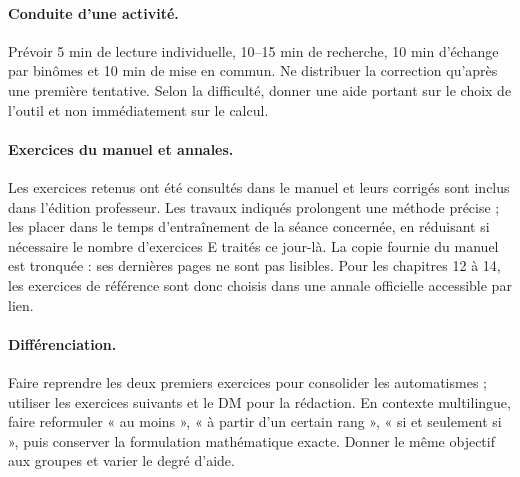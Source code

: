 \paragraph{Conduite d'une activité.} Prévoir 5 min de lecture individuelle, 10--15 min de recherche, 10 min d'échange par binômes et 10 min de mise en commun. Ne distribuer la correction qu'après une première tentative. Selon la difficulté, donner une aide portant sur le choix de l'outil et non immédiatement sur le calcul.
\paragraph{Exercices du manuel et annales.} Les exercices retenus ont été consultés dans le manuel et leurs corrigés sont inclus dans l'édition professeur. Les travaux indiqués prolongent une méthode précise ; les placer dans le temps d'entraînement de la séance concernée, en réduisant si nécessaire le nombre d'exercices E traités ce jour-là. La copie fournie du manuel est tronquée : ses dernières pages ne sont pas lisibles. Pour les chapitres 12 à 14, les exercices de référence sont donc choisis dans une annale officielle accessible par lien.
\paragraph{Différenciation.} Faire reprendre les deux premiers exercices pour consolider les automatismes ; utiliser les exercices suivants et le DM pour la rédaction. En contexte multilingue, faire reformuler « au moins », « à partir d'un certain rang », « si et seulement si », puis conserver la formulation mathématique exacte. Donner le même objectif aux groupes et varier le degré d'aide.

